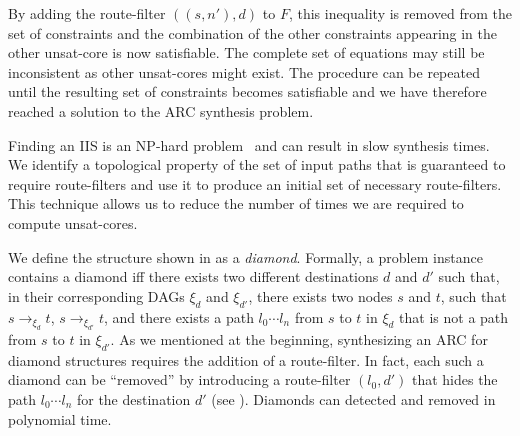 By adding the route-filter $((s,n'),d)$ to $F$, this inequality is removed from the set of constraints
and the combination of the other constraints appearing in the other unsat-core is now satisfiable.
The complete set of equations may still be inconsistent as other unsat-cores might exist. 
The procedure can be repeated until the resulting set of constraints becomes satisfiable
and we have therefore reached a solution to the ARC synthesis problem.


Finding an IIS is an NP-hard problem~\cite{iiscomplexity}
and can result in slow synthesis times.
We identify a topological property of the set of input paths that 
is guaranteed to require route-filters and use it to produce an initial set of necessary route-filters.
This technique allows us to reduce the number of times we are required to compute  unsat-cores.

We define the structure shown in 
as a \emph{diamond}. 
Formally, a problem instance contains a diamond iff there exists two different destinations $d$ and $d'$
such that, in their corresponding DAGs $\xi_d$ and $\xi_{d'}$,
there exists two nodes $s$ and $t$, such that $s\rightarrow_{\xi_d} t$,
$s\rightarrow_{\xi_{d'}} t$, and
there exists a path $l_0\cdots l_n$ from $s$ to $t$ in $\xi_d$ that is not a path from
$s$ to $t$ in $\xi_{d'}$.
As we mentioned at the beginning, synthesizing an ARC for  diamond structures requires
the addition of a route-filter.
In fact, each such a diamond can be ``removed'' by introducing a route-filter $(l_0, d')$ that hides
the path $l_0\cdots l_n$ for the destination $d'$ (see ).
Diamonds can detected and removed in polynomial time.

